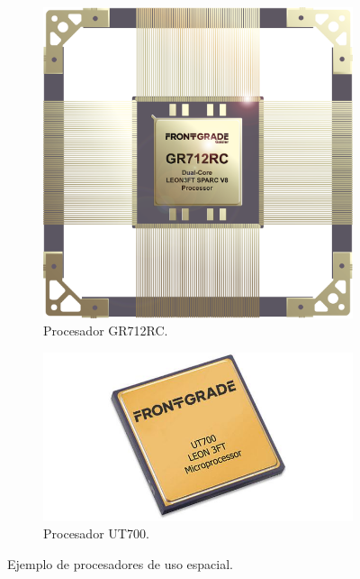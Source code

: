 
\vspace{1cm}

\begin{figure}[!htpb]
     \centering
     \begin{subfigure}[b]{0.4\textwidth}
         \centering
         \includegraphics[width=.85\textwidth]{./Figures/gr712rc}
         \caption{Procesador GR712RC.}
         \label{fig:procesadores1de2}
     \end{subfigure}
     \hfill
     \begin{subfigure}[b]{0.50\textwidth}
         \centering
         \includegraphics[width=1.28\textwidth]{./Figures/ut700}
         \caption{Procesador UT700.}
         \label{fig:procesadores2de2}
     \end{subfigure}
        \caption{Ejemplo de procesadores de uso espacial.\protect\footnotemark}
        \label{fig:procesadores}
\end{figure}

